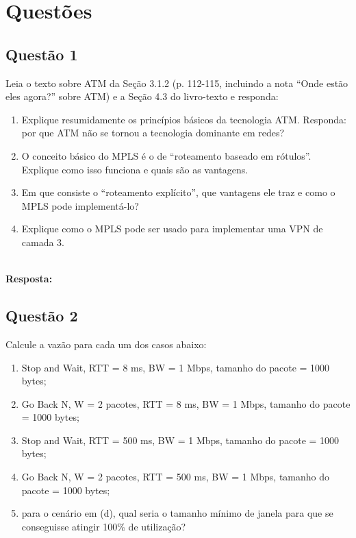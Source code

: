 \section{Questões}\label{sec:questoes}


\subsection{Questão 1}
Leia o texto sobre ATM da Seção 3.1.2 (p. 112-115, incluindo a nota
“Onde estão eles agora?” sobre ATM) e a Seção 4.3 do livro-texto e responda:


\begin{enumerate}[label=\alph*.]
    \item Explique resumidamente os princípios básicos da tecnologia ATM. Responda: por
que ATM não se tornou a tecnologia dominante em redes?
    \item O conceito básico do MPLS é o de “roteamento baseado em rótulos”. Explique
como isso funciona e quais são as vantagens.
    \item  Em que consiste o “roteamento explícito”, que vantagens ele traz e como o
MPLS pode implementá-lo?
    \item Explique como o MPLS pode ser usado para implementar uma VPN de camada 3.
\end{enumerate}\\

\noindent
\textbf{Resposta:} \\


\subsection{Questão 2}
 Calcule a vazão para cada um dos casos abaixo:

\begin{enumerate}[label=\alph*.]
    \item Stop and Wait, RTT = 8 ms, BW = 1 Mbps, tamanho do pacote = 1000 bytes;
    \item Go Back N, W = 2 pacotes, RTT = 8 ms, BW = 1 Mbps, tamanho do pacote = 1000
bytes;
    \item Stop and Wait, RTT = 500 ms, BW = 1 Mbps, tamanho do pacote = 1000 bytes;
    \item  Go Back N, W = 2 pacotes, RTT = 500 ms, BW = 1 Mbps, tamanho do pacote = 1000
bytes;
    \item para o cenário em (d), qual seria o tamanho mínimo de janela para que se
conseguisse atingir 100\% de utilização? 
\end{enumerate}\\


